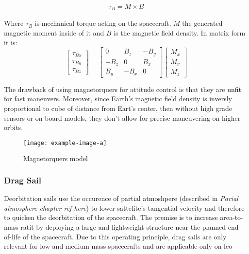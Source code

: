         \begin{align}
            \tau_B = M \times B
        \end{align}

        Where $\tau_B$ is mechanical torque acting on the spacecraft, $M$ the generated magnetic moment inside of it and $B$ is the magnetic field density. In matrix form it is:
        \begin{equation}
            \begin{bmatrix}
            \tau_{Bx}\\ 
            \tau_{By}\\ 
            \tau_{Bz}
            \end{bmatrix}
            =
            \begin{bmatrix}
            0 & B_z & -B_y\\ 
            -B_z & 0 & B_x\\ 
            B_y & -B_x & 0
            \end{bmatrix}
            \begin{bmatrix}
            M_x\\
            M_y\\
            M_z
            \end{bmatrix}                
        \end{equation}


        The drawback of using magnetorquers for attitude control is that they are unfit for fast maneuvers. Moreover, since Earth's magnetic field density is inversly proportional to cube of distance from Eart's center, then without high grade sensors or on-board models, they don't allow for precise maneuvering on higher orbits.

        \begin{figure}[hb]
            \centering
            \texttt{[image: example-image-a]}
            \caption{Magnetorquers model}
            \label{fig:mag_simulink}
        \end{figure}


    \subsubsection{Drag Sail}
        Deorbitation sails use the occurence of partial atmoshpere (described in \textit{Parial atmosphere chapter ref here}) to lower sattelite's tangential velocity and therefore to quicken the deorbitation of the spacecraft. The premise is to increase area-to-mass-ratit by deploying a large and lightweight structure near the planned end-of-life of the spacecraft. Due to this operating principle, drag sails are only relevant for low and medium mass spacecrafts and are applicable only on \ac{leo}


